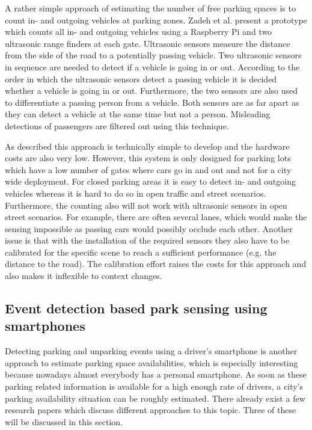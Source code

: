 A rather simple approach of estimating the number of free parking spaces is to count in- and outgoing vehicles at parking zones. Zadeh et al. \cite{smarturbanparkingdetection} present a prototype which counts all in- and outgoing vehicles using a Raspberry Pi and two ultrasonic range finders at each gate. Ultrasonic sensors measure the distance from the side of the road to a potentially passing vehicle. Two ultrasonic sensors in sequence are needed to detect if a vehicle is going in or out. According to the order in which the ultrasonic sensors detect a passing vehicle it is decided whether a vehicle is going in or out. Furthermore,
the two sensors are also used to differentiate a passing person from a vehicle. Both sensors are as far apart as they can detect a vehicle at the same time but not a person. Misleading detections of passengers are filtered out using this technique.

As described this approach is technically simple to develop and the hardware costs are also very low. However, this system is only designed for parking lots which have a low number of gates where cars go in and out and not for a city wide deployment. For closed parking areas it is easy to detect in- and outgoing vehicles whereas it is hard to do so in open traffic and street scenarios. Furthermore, the counting also will not work with ultrasonic sensors in open street scenarios. For example, there are often several lanes, which would make the sensing impossible as passing cars would possibly occlude each other. Another issue is that with the installation of the required sensors they also have to be calibrated for the specific scene to reach a sufficient performance (e.g. the distance to the road). The calibration effort raises the costs for this approach and also makes it inflexible to context changes.







\subsection{Event detection based park sensing using smartphones}
\label{sec:event_detection_park_sensing}

Detecting parking and unparking events using a driver's smartphone is another approach to estimate parking space availabilities, which is especially interesting because nowadays almost everybody has a personal smartphone. As soon as these parking related information is available for a high enough rate of drivers, a city's parking availability situation can be roughly estimated. There already exist a few research papers which discuss different approaches to this topic. Three of these will be discussed in this
section.

